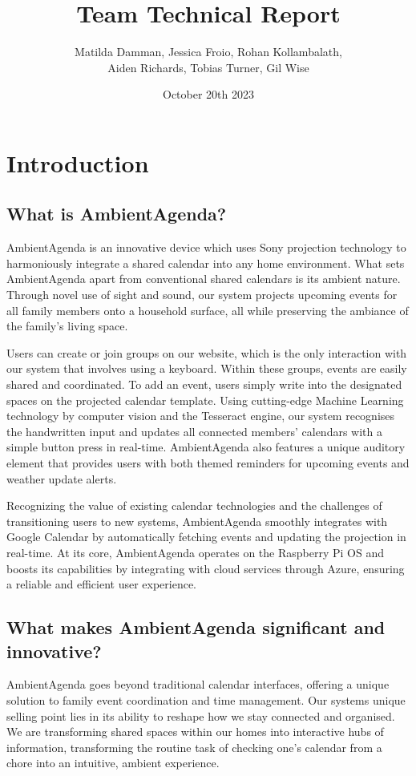 \documentclass[11pt, a4, oneside]{article}
\title{Team Technical Report}
\author{Matilda Damman, Jessica Froio, Rohan Kollambalath,\\ Aiden Richards, Tobias Turner, Gil Wise}
\date{October 20th 2023}
\begin{document}
\maketitle
\newpage	
\tableofcontents
\newpage	

\section{Introduction}
\subsection{What is AmbientAgenda?}
\noindent AmbientAgenda is an innovative device which uses Sony projection technology to harmoniously integrate a shared calendar into any home environment. What sets AmbientAgenda apart from conventional shared calendars is its ambient nature. Through novel use of sight and sound, our system projects upcoming events for all family members onto a household surface, all while preserving the ambiance of the family's living space. \par
\medskip

\noindent Users can create or join groups on our website, which is the only interaction with our system that involves using a keyboard. Within these groups, events are easily shared and coordinated. To add an event, users simply write into the designated spaces on the projected calendar template. Using cutting-edge Machine Learning technology by computer vision and the Tesseract engine, our system recognises the handwritten input and updates all connected members' calendars with a simple button press in real-time. AmbientAgenda also features a unique auditory element that provides users with both themed reminders for upcoming events and weather update alerts. \par
\medskip

\noindent Recognizing the value of existing calendar technologies and the challenges of transitioning users to new systems, AmbientAgenda smoothly integrates with Google Calendar by automatically fetching events and updating the projection in real-time. At its core, AmbientAgenda operates on the Raspberry Pi OS and boosts its capabilities by integrating with cloud services through Azure, ensuring a reliable and efficient user experience. \par

\subsection{What makes AmbientAgenda significant and innovative?}
\noindent AmbientAgenda goes beyond traditional calendar interfaces, offering a unique solution to family event coordination and time management. Our systems unique selling point lies in its ability to reshape how we stay connected and organised. We are transforming shared spaces within our homes into interactive hubs of information, transforming the routine task of checking one's calendar from a chore into an intuitive, ambient experience. \par
\medskip
\end{document}

